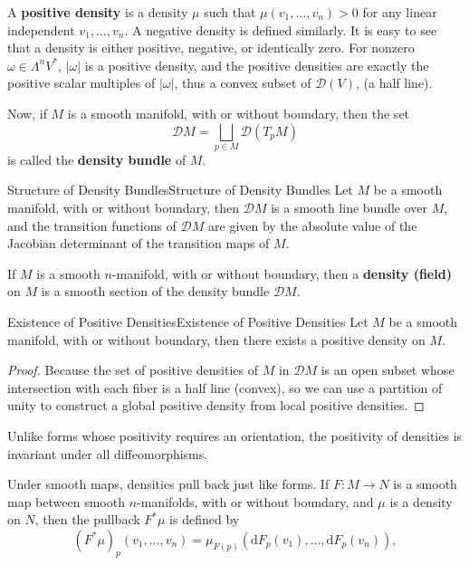\documentclass[../main.tex]{subfiles}
\begin{document}
A \textbf{positive density} is a density $\mu$ such that $\mu(v_1, \ldots , v_n) > 0$ for any linear independent $v_1, \ldots , v_n$. A negative density is defined similarly. It is easy to see that a density is either positive, negative, or identically zero. For nonzero $\omega \in \Lambda^n V^*$, $|\omega|$ is a positive density, and the positive densities are exactly the positive scalar multiples of $|\omega|$, thus a convex subset of $\mathcal{D}(V)$, (a half line).

Now, if $M$ is a smooth manifold, with or without boundary, then the set
\begin{equation}
  \mathcal{D} M = \bigsqcup_{p\in M} \mathcal{D}(T_p M)
\end{equation}
is called the \textbf{density bundle} of $M$.

\begin{proposition}{Structure of Density Bundles}{Structure of Density Bundles}
  Let $M$ be a smooth manifold, with or without boundary, then $\mathcal{D} M$ is a smooth line bundle over $M$, and the transition functions of $\mathcal{D} M$ are given by the absolute value of the Jacobian determinant of the transition maps of $M$.
\end{proposition}

If $M$ is a smooth $n$-manifold, with or without boundary, then a \textbf{density (field)} on $M$ is a smooth section of the density bundle $\mathcal{D} M$.

\begin{proposition}{Existence of Positive Densities}{Existence of Positive Densities}
  Let $M$ be a smooth manifold, with or without boundary, then there exists a positive density on $M$.
\end{proposition}
\begin{proof}
  Because the set of positive densities of $M$ in $\mathcal{D}M$ is an open subset whose intersection with each fiber is a half line (convex), so we can use a partition of unity to construct a global positive density from local positive densities.
\end{proof}

\begin{remark}
  Unlike forms whose positivity requires an orientation, the positivity of densities is invariant under all diffeomorphisms.
\end{remark}

Under smooth maps, densities pull back just like forms. If $F: M \to N$ is a smooth map between smooth $n$-manifolds, with or without boundary, and $\mu$ is a density on $N$, then the pullback $F^* \mu$ is defined by
\begin{equation*}
  (F^* \mu)_p (v_1, \ldots , v_n) = \mu_{F(p)} (\mathrm{d} F_p (v_1), \ldots , \mathrm{d} F_p (v_n)),
\end{equation*}
\end{document}
